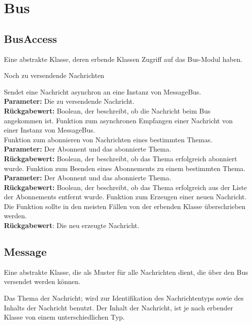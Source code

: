 \documentclass[entwurf.tex]{subfiles}
\begin{document}
	\section{Bus}
	\subsection{BusAccess}
	\label{Class:BusAccess} 
		Eine abstrakte Klasse, deren erbende Klassen Zugriff auf das Bus-Modul haben.
		\begin{description}
				Noch zu versendende Nachrichten
			
				Sendet eine Nachricht asynchron an eine Instanz von MessageBus.\\ 
				\textbf{Parameter:} Die zu versendende Nachricht.\\ 
				\textbf{Rückgabewert:} Boolean, der beschreibt, ob die Nachricht beim Bus angekommen ist.
				Funktion zum asynchronen Empfangen einer Nachricht von einer Instanz von MessageBus.\\ 
				Funktion zum abonnieren von Nachrichten eines bestimmten Themas.\\ 
				\textbf{Parameter:} Der Abonnent und das abonnierte Thema.\\ 
				\textbf{Rückgabewert:} Boolean, der beschreibt, ob das Thema erfolgreich abonniert wurde.
				Funktion zum Beenden eines Abonnements zu einem bestimmten Thema.\\ 
				\textbf{Parameter:} Der Abonnent und das abonnierte Thema.\\ 
				\textbf{Rückgabewert:} Boolean, der beschreibt, ob das Thema erfolgreich aus der Liste der Abonnements entfernt wurde.
				Funktion zum Erzeugen einer neuen Nachricht. Die Funktion sollte in den meisten Fällen von der erbenden Klasse überschrieben werden. \\
				\textbf{Rückgabewert}: Die neu erzeugte Nachricht.
		\end{description}
  		
	\subsection{Message}
	\label{Class:Message} 
		Eine abstrakte Klasse, die als Muster für alle Nachrichten dient, die über den Bus versendet werden können.
		\begin{description}
			\attr{protected topic: Topic}  
				Das Thema der Nachricht; wird zur Identifikation des Nachrichtentyps sowie des Inhalts der Nachricht benutzt.
			\attr{Inhalt}
				Der Inhalt der Nachricht, ist je nach erbender Klasse von einem unterschiedlichen Typ.
		\end{description}
\end{document}
